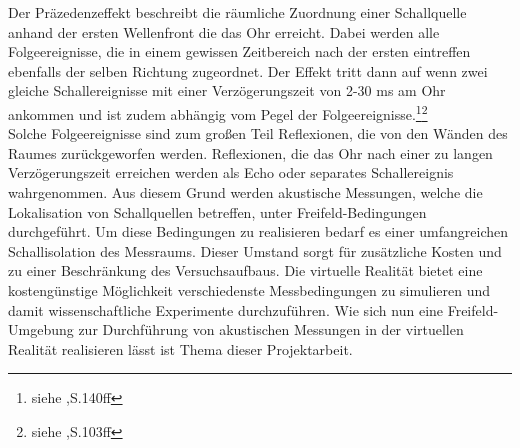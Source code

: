 

Der Präzedenzeffekt beschreibt die räumliche Zuordnung einer Schallquelle anhand der ersten Wellenfront die das Ohr erreicht. Dabei werden alle Folgeereignisse, die in einem gewissen Zeitbereich nach der ersten eintreffen ebenfalls der selben Richtung zugeordnet. Der Effekt tritt dann auf wenn zwei gleiche Schallereignisse mit einer Verzögerungszeit von 2-30 ms am Ohr ankommen und ist zudem abhängig vom Pegel der Folgeereignisse.\footnote{siehe \cite{ency},S.140ff}\footnote{siehe \cite{handbuch},S.103ff}\\
Solche Folgeereignisse sind zum großen Teil Reflexionen, die von den Wänden des Raumes zurückgeworfen werden. Reflexionen, die das Ohr nach einer zu langen Verzögerungszeit erreichen werden als Echo oder separates Schallereignis wahrgenommen. 
Aus diesem Grund werden akustische Messungen, welche die Lokalisation von Schallquellen betreffen, unter Freifeld-Bedingungen durchgeführt.
Um diese Bedingungen zu realisieren bedarf es einer umfangreichen Schallisolation des Messraums. Dieser Umstand sorgt für zusätzliche Kosten und zu einer Beschränkung des
Versuchsaufbaus.
Die virtuelle Realität bietet eine kostengünstige Möglichkeit verschiedenste Messbedingungen zu simulieren und damit wissenschaftliche Experimente durchzuführen.
Wie sich nun eine Freifeld-Umgebung zur Durchführung von akustischen Messungen in der virtuellen Realität realisieren lässt ist Thema dieser Projektarbeit. 


